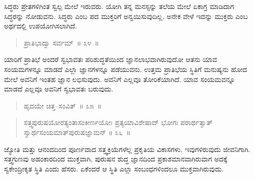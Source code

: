 
ಸಿದ್ಧರು ಪ್ರೇತಗಳಿಗಿಂತ ಸ್ವಲ್ಪ ಮೇಲೆ ಇರುವರು. ಯೋಗಿ ತನ್ನ ಮನಸ್ಸನ್ನು ತಲೆಯ ಮೇಲೆ ಏಕಾಗ್ರ ಮಾಡಿದಾಗ ಸಿದ್ಧರನ್ನು ನೋಡುವನು. ಸಿದ್ಧರು ಎಂಬ ಪದ ಮುಕ್ತರಿಗೆ ಅನ್ವಯಿಸುವುದಿಲ್ಲ. ಅನೇಕ ವೇಳೆ ಇದನ್ನು ಮುಕ್ತರು ಎಂಬ ಅರ್ಥದಲ್ಲಿ ಉಪಯೋಗಿಸಲಾಗಿದೆ. 

\vspace{-0.3cm}

\begin{verse}
ಪ್ರಾತಿಭಾದ್ವಾ ಸರ್ವಮ್​~॥ ೩೪~॥
\end{verse}

\vspace{-0.3cm}


ಯಾರಿಗೆ ಪ್ರಾತಿಭೆ ಅಂದರೆ ಸ್ವಭಾವತಃ ಪರಿಶುದ್ಧತೆಯಿಂದ ಜ್ಞಾನಲಾಭವಾಗಿರುವುದೋ ಆತನು ಯಾವ ಸಂಯಮಗಳನ್ನೂ ಮಾಡದೆ ಎಲ್ಲಾ ಜ್ಞಾನಗಳನ್ನೂ ಪಡೆಯುವನು. ಉತ್ತಮ ಪ್ರಾತಿಭೆಯ ಸ್ಥಿತಿಗೆ ಮನುಷ್ಯನು ಹೋದ ಮೇಲೆ ಅವನಿಗೆ ಇಂತಹ ಜ್ಞಾನ ಲಭಿಸುವುದು. ಅವನಿಗೆ ಎಲ್ಲವೂ ತೋರಿಕೆಯಾಗಿದೆ. ಯಾವ ಸಂಯಮವನ್ನೂ ಮಾಡದೆ ಎಲ್ಲವೂ ಅವನಿಗೆ ಸ್ವಭಾವತಃ ಬರುವುದು. 

\vspace{-0.3cm}

\begin{verse}
ಹೃದಯೇ ಚಿತ್ತ–ಸಂವಿತ್​~॥ ೩೫~॥
\end{verse}

\vspace{-0.3cm}


\vspace{-0.3cm}

\begin{verse}
ಸತ್ತ್ವಪುರುಷಯೋರತ್ಯಂತಾಸಂಕೀರ್ಣಯೋಃ ಪ್ರತ್ಯಯಾವಿಶೇಷಾದ್​ ಭೋಗಃ ಪರಾರ್ಥತ್ವಾತ್​ ಸ್ವಾರ್ಥಸಂಯಮಾತ್​ ಪುರುಷಜ್ಞಾಮನ್​ \hfill{॥ ೩೬~॥}
\end{verse}

\vspace{-0.3cm}


\vfill\eject

ಜ್ಯೋತಿ ಮತ್ತು ಆನಂದದಿಂದ ಪೂರ್ಣವಾದ ಸತ್ತ್ವಕ್ರಿಯೆಗಳೆಲ್ಲ ಪ್ರಕೃತಿಯ ವಿಕಾಸಗಳು. ಇವುಗಳಿರುವುದು ಜೀವನಿಗಾಗಿ. ಸತ್ತ್ವಗುಣವು ಅಹಂಕಾರದಿಂದ ಮುಕ್ತವಾಗಿ, ಪುರುಷನ ಶುದ್ಧ ಜ್ಞಾನದಿಂದ ಪ್ರಕಾಶಮಾನವಾಗಿರುವಾಗ ಅದಕ್ಕೆ ಸ್ವಕೇಂದ್ರೀಕೃತ ಸ್ಥಿತಿ ಎಂದು ಹೆಸರು. ಏಕೆಂದರೆ ಆ ಸ್ಥಿತಿ ಎಲ್ಲಾ ಸಂಬಂಧಗಳಿಂದಲೂ ಮುಕ್ತವಾಗಿರುವುದು. 

